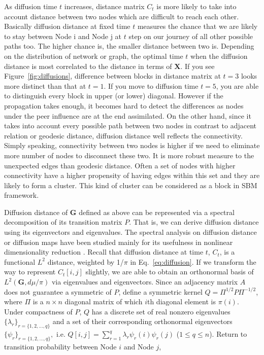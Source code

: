 \documentclass[12pt]{article}
\theoremstyle{definition}
\begin{document}
As diffusion time $t$ increases, distance matrix $C_{t}$ is more likely to take into account distance between two nodes which are difficult to reach each other. Basically diffusion distance at fixed time $t$ measures the chance that we are likely to stay between Node i and Node j at $t$ step on our journey of all other possible paths too. The higher chance is, the smaller distance between two is. Depending on the distribution of network or graph, the optimal time $t$ when the diffusion distance is most correlated to the distance in terms of $\mathbf{X}$. If you see Figure~\ref{fig:diffusions}, difference between blocks in distance matrix at $t=3$ looks more distinct than that at $t=1$.  If you move to diffusion time $t=5$, you are able to distinguish every block in upper (or lower) diagonal. However if the propagation takes enough, it becomes hard to detect the differences as nodes under the peer influence are at the end assimilated. On the other hand, since it takes into account every possible path between two nodes in contrast to adjacent relation or geodesic distance, diffusion distance well reflects the connectivity. Simply speaking, connectivity between two nodes is higher if we need to eliminate more number of nodes to disconnect these two. It is more robust measure to the unexpected edges than geodesic distance. Often a set of nodes with higher connectivity have a higher propensity of having edges within this set and they are likely to form a cluster. This kind of cluster can be considered as a block in SBM framework. 
	
Diffusion distance of $\boldsymbol{G}$ defined as above can be represented via a spectral decomposition of its transition matrix $P$. That is, we can derive diffusion distance using its eigenvectors and eigenvalues. The spectral analysis on diffusion distance or diffusion maps have been studied mainly for its usefulness in nonlinear dimensionality reduction \citep{coifman2006diffusion,lafon2006diffusion}. 
Recall that diffusion distance at time $t$, $C_{t}$, is a functional $L^2$ distance, weighted by 1/$\pi$ in Eq.~\ref{eq:diffusion}. If we transform the way to represent $C_{t}[i,j]$ slightly, we are able to obtain an orthonormal basis of $L^{2}(\mathbf{G}, d\mu / \pi)$ via eigenvalues and eigenvectors. 
Since an adjacency matrix $A$ does not guarantee a symmetric of $P$, define a symmetric kernel $Q = \Pi^{1/2} P \Pi^{-1/2}$, where $\Pi$ is a $n \times n$ diagonal matrix of which $i$th diagonal element is $\pi(i)$. Under compactness of $P$, $Q$ has a discrete set of real nonzero eigenvalues $\{ \lambda_{r} \}_{r = \{1,2,...,q \}}$ and a set of their corresponding orthonormal eigenvectors $\{ \psi_{r} \}_{r = \{1,2,..., q \} },$ i.e. $Q[i,j] = \sum\limits_{r=1}^{q} \lambda_{r} \psi_{r}(i) \psi_{r}(j)$ ($1 \leq q \leq n$).  Return to transition probability between Node $i$ and Node $j$,
\end{document}
